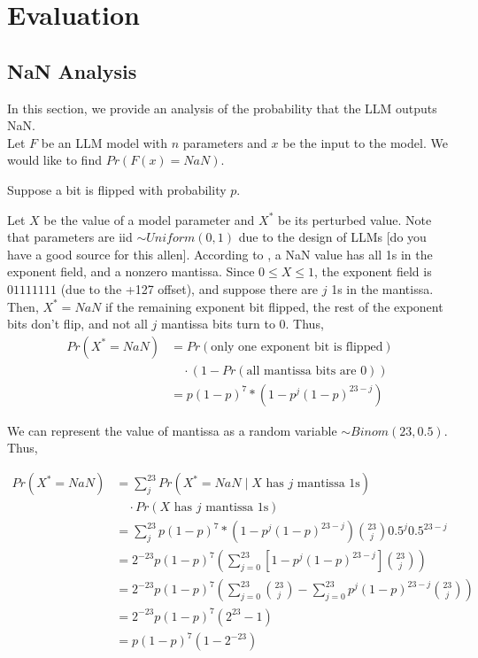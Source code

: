 \section{Evaluation}
\label{sec:eval}

\subsection{NaN Analysis}
\label{sec:nan}

In this section, we provide an analysis of the probability that the LLM outputs NaN. \\

Let $F$ be an LLM model with $n$ parameters and $x$ be the input to the model. We would like to find $Pr(F(x) = NaN)$.

Suppose a bit is flipped with probability $p$.

Let $X$ be the value of a model parameter and $X^*$ be its perturbed value. Note that parameters are iid $\sim Uniform(0, 1)$ due to the design of LLMs [do you have a good source for this allen]. According to \cite{IEEE754}, a NaN value has all 1s in the exponent field, and a nonzero mantissa. Since $0 \le X \le 1$, the exponent field is $01111111$ (due to the +127 offset), and suppose there are $j$ 1s in the mantissa. \\

Then, $X^* = NaN$ if the remaining exponent bit flipped, the rest of the exponent bits don't flip, and not all $j$ mantissa bits turn to 0. Thus,
\begin{align*}
	Pr(X^* = NaN) &= Pr(\text{only one exponent bit is flipped}) \\
    & \quad \cdot (1 - Pr(\text{all mantissa bits are 0})) \\
	&= p(1 - p)^7 * (1 - p^j(1 - p)^{23 - j})
\end{align*}

We can represent the value of mantissa as a random variable $\sim Binom(23, 0.5)$. Thus,

\begin{align*}
	Pr(X^* = NaN) &= \sum_j^{23} Pr(X^* = NaN \mid X \text{ has $j$ mantissa 1s}) \\
    & \quad \cdot Pr(X\text{ has $j$ mantissa 1s}) \\
	&= \sum_j^{23} p(1 - p)^7 * (1 - p^j(1 - p)^{23 - j})\binom{23}{j}0.5^j0.5^{23 - j} \\
	&= 2^{-23} p (1 - p)^7 \left(\sum_{j=0}^{23}[1 - p^j(1 - p)^{23 - j}] \binom{23}{j}\right) \\
	&= 2^{-23} p (1 - p)^7 \left(\sum_{j=0}^{23}\binom{23}{j} - \sum_{j=0}^{23}p^j(1 - p)^{23 - j} \binom{23}{j}\right) \\
	&= 2^{-23} p (1 - p)^7(2^{23} - 1) \\
	&= p(1 - p)^7(1 - 2^{-23})
\end{align*}

